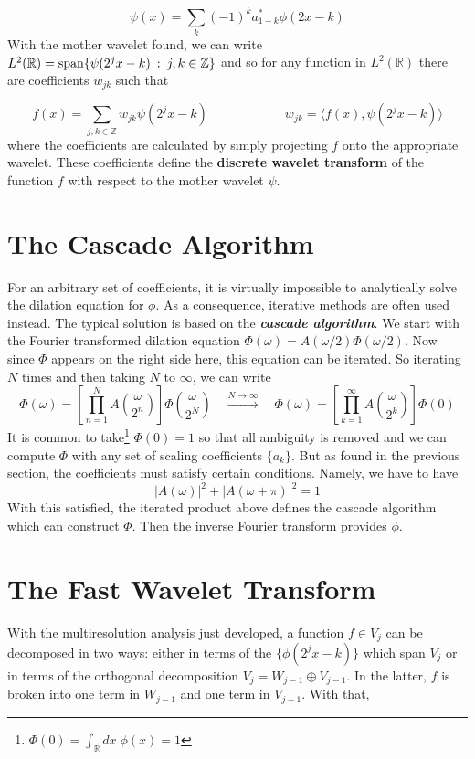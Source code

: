\documentclass[onecolumn]{gwclass}
\begin{document}
$$\psi(x) = \sum_k (-1)^k a_{1-k}^*  \phi(2x - k) $$
With the mother wavelet found, we can write $L^2(\mathbb{R}) = \text{\normalfont{span}}\{\psi(2^jx - k) \::\: j,k\in\mathbb{Z} \}$ and so for any function in $L^2(\mathbb{R})$ there are coefficients $w_{jk}$ such that

$$ f(x) = \sum_{j,k\in\mathbb{Z}} w_{jk} \psi(2^jx - k) \qquad\qquad\qquad w_{jk} = \langle f(x), \psi(2^jx - k) \rangle $$
where the coefficients are calculated by simply projecting $f$ onto the appropriate wavelet. These coefficients define the \textbf{discrete wavelet transform} of the function $f$ with respect to the mother wavelet $\psi$.


\section{The Cascade Algorithm}
For an arbitrary set of coefficients, it is virtually impossible to analytically solve the dilation equation for $\phi$. As a consequence, iterative methods are often used instead. The typical solution is based on the \textbf{\emph{cascade algorithm}}. We start with the Fourier transformed dilation equation $\Phi(\omega) = A(\omega/2)\Phi(\omega/2)$. Now since $\Phi$ appears on the right side here, this equation can be iterated. So iterating $N$ times and then taking $N$ to $\infty$, we can write
$$ \Phi(\omega) = \left[\prod_{n=1}^N A\left(\frac{\omega}{2^n}\right)\right] \Phi\left(\frac{\omega}{2^N}\right) \quad \xrightarrow{N\to\infty} \quad \Phi(\omega) = \left[\prod_{k=1}^\infty A\left(\frac{\omega}{2^k}\right)\right] \Phi(0) $$
It is common to take\footnote{$\Phi(0)=\int_\mathbb{R}dx\;\phi(x)=1$} $\Phi(0)=1$ so that all ambiguity is removed and we can compute $\Phi$ with any set of scaling coefficients $\{a_k\}$. But as found in the previous section, the coefficients must satisfy certain conditions. Namely, we have to have
$$ |A(\omega)|^2 + |A(\omega+\pi)|^2=1 $$
With this satisfied, the iterated product above defines the cascade algorithm which can construct $\Phi$. Then the inverse Fourier transform provides $\phi$.



\section{The Fast Wavelet Transform}
With the multiresolution analysis just developed, a function $f\in V_j$ can be decomposed in two ways: either in terms of the $\{\phi(2^jx-k)\}$ which span $V_j$ or in terms of the orthogonal decomposition $V_j = W_{j-1}\oplus V_{j-1}$. In the latter, $f$ is broken into one term in $W_{j-1}$ and one term in $V_{j-1}$. With that, 
\end{document}
